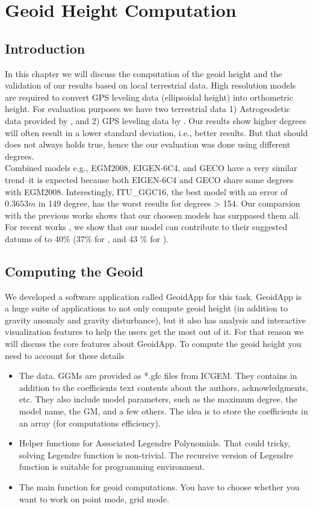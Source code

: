 \chapter{Geoid Height Computation}

\section{Introduction}
In this chapter we will discuss the computation of the geoid height and the validation of our results based on local terrestrial data. High resolution models are required to convert GPS leveling data (ellipsoidal height) into orthometric height. For evaluation purposes we have two terrestrial data 1) Astrogeodetic data provided by \cite{osman}, and 2) GPS leveling data by \cite{ahmed_msc}. Our results show higher degrees will often result in a lower standard deviation, i.e., better results. But that should does not always holds true, hence the our evaluation was done using different degrees.
\\
Combined models e.g., EGM2008, EIGEN-6C4, and GECO have a very similar trend--it is expected because both EIGEN-6C4 and GECO share some degrees with EGM2008. Interestingly, ITU\_GGC16, the best model with an error of $0.3653m$ in 149 degree, has the worst results for degrees > 154. Our comparsion with the previous works \citep{ahmed_msc, fashir, godah} shows that our choosen models has surppased them all. For recent works \citep{ahmed_msc, godah}, we show that our model can contribute to their suggested datums of to 40\% (37\% for \citep{ahmed_msc}, and 43 \% for \citep{godah}).



\section{Computing the Geoid}

We developed a software application called GeoidApp for this task. GeoidApp is a huge suite of applications to not only compute geoid height (in addition to gravity anomaly and gravity disturbance), but it also has analysis and interactive visualization features to help the users get the most out of it. For that reason we will discuss the core features about GeoidApp. To compute the geoid height you need to account for these details

\begin{itemize}
	\item The data. GGMs are provided as *.gfc files from ICGEM. They contains in addition to the coefficients text contents about the authors, acknowledgments, etc. They also include model parameters, such as the maximum degree, the model name, the GM, and a few others. The idea is to store the coefficients in an array (for computations efficiency). 
	\item Helper functions for Associated Legendre Polynomials. That could tricky, solving Legendre function is non-trivial. The recursive version of Legendre function is suitable for programming environment.
	\item The main function for geoid computations. You have to choose whether you want to work on point mode, grid mode.
\end{itemize}

